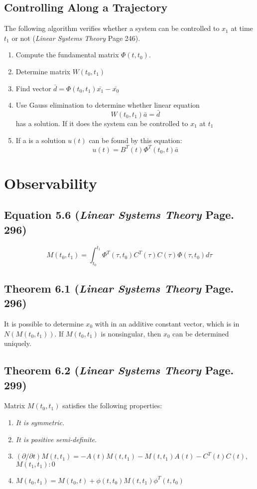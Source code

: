 \documentclass[12pt]{article}
\begin{document}
\subsection*{Controlling Along a Trajectory}
The following algorithm verifies whether a system can be controlled to $x_1$ at time $t_1$ or not ({\em Linear Systems Theory} Page 246).
\begin{enumerate}
	\item Compute the fundamental matrix $\Phi(t,t_0)$.
	\item Determine matrix $W(t_0,t_1)$
	\item Find vector $\bar{d}=\Phi(t_0,t_1)\bar{x_1}-\bar{x_0}$
	\item Use Gauss elimination to determine whether linear equation 
	$$W(t_0,t_1)\bar{a}=\bar{d}$$
	has a solution. If it does the system can be controlled to $x_1$ at $t_1$
	\item If a is a solution $u(t)$ can be found by this equation:
	$$u(t)=B^T(t)\Phi^T(t_0,t)\bar{a}$$
\end{enumerate}

\newpage
\section*{Observability}

\subsection*{Equation 5.6 ({\em Linear Systems Theory} Page. 296)}
$$M(t_0,t_1)=\int_{t_0}^{t_1}\Phi^T(\tau,t_0)C^T(\tau)C(\tau)\Phi(\tau,t_0)d\tau$$

\subsection*{Theorem 6.1 ({\em Linear Systems Theory} Page. 296)}
It is possible to determine $x_0$ with in an additive constant vector, which is in $N(M(t_0,t_1))$. If $M(t_0,t_1)$ is nonsingular, then $x_0$ can be determined uniquely.

\subsection*{Theorem 6.2 ({\em Linear Systems Theory} Page. 299)}
Matrix $M(t_0,t_1)$ satisfies the following properties:
\renewcommand{\labelenumiii}{\Roman{enumii}}
\begin{enumerate}
  \item {\em It is symmetric.}
  \item {\em It is positive semi-definite}. 
  \item $(\partial/\partial t)M(t,t_1)=-A(t)M(t,t_1)-M(t,t_1)A(t)-C^T(t)C(t)$, \\$M(t_1,t_1):0$
  \item $M(t_0,t_1)=M(t_0,t)+\phi(t,t_0)M(t,t_1)\phi^T(t,t_0)$
\end{enumerate}
\end{document}
